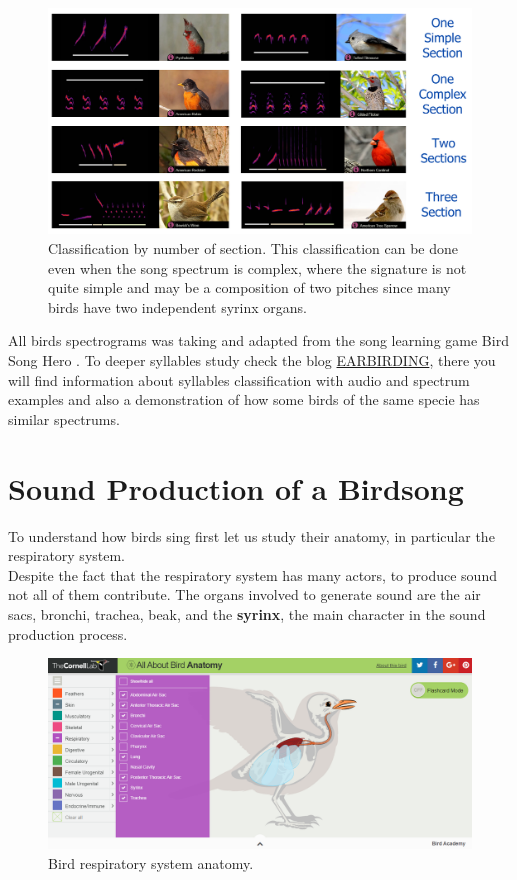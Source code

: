 \begin{figure}[H]
    \centering
    \includegraphics[scale=1.2]{Images/song_sections.png}
    \caption{Classification by number of section. This classification can be done even when the song spectrum is complex, where the signature is not quite simple and may be a composition of two pitches since many birds have two independent syrinx organs.}
    \label{fig:quality}
\end{figure}

All birds spectrograms was taking and adapted from the song learning game Bird Song Hero \cite{hero}. To deeper syllables study check the blog \href{http://earbirding.com/blog/archives/category/spectrograms}{EARBIRDING}, there you will find information about syllables classification with audio and spectrum examples and also a demonstration of how some birds of the same specie has similar spectrums.

\section{Sound Production of a Birdsong}

To understand how birds sing first let us study their anatomy, in particular the respiratory system.\\


Despite the fact that the respiratory system has many actors, to produce sound not all of them contribute. The organs involved to generate sound are the air sacs, bronchi, trachea, beak, and the \textbf{syrinx}, the main character in the sound production process.

\begin{figure}[H]
    \centering
    \includegraphics[width=0.85\linewidth]{Images/bird_sound_organs.png}
    \caption{Bird respiratory system anatomy. \cite{birdanatomy} }
    \label{fig:bird_sound_organs}
\end{figure}


